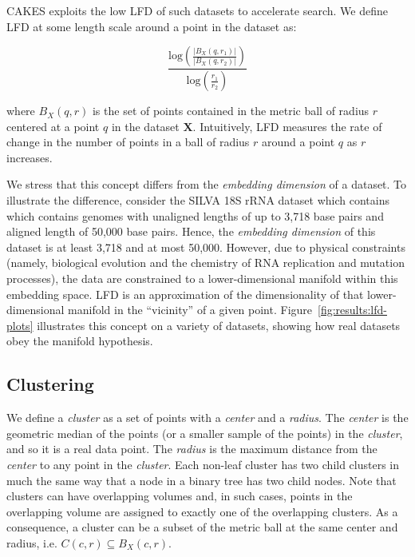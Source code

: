 CAKES exploits the low LFD of such datasets to accelerate search.
We define LFD at some length scale around a point in the dataset as:

\begin{equation}
    \frac{\text{log} \left( \frac{|B_X(q, r_1)|}{|B_X(q, r_2)|} \right) }{\text{log} \left( \frac{r_1}{r_2} \right) }
    \label{eq:methods:lfd-original}
\end{equation}

where $B_X(q, r)$ is the set of points contained in the metric ball of radius $r$ centered at a point $q$ in the dataset $\textbf{X}$.
Intuitively, LFD measures the rate of change in the number of points in a ball of radius $r$ around a point $q$ as $r$ increases.

We stress that this concept differs from the \textit{embedding dimension} of a dataset.
To illustrate the difference, consider the SILVA 18S rRNA dataset which contains which contains genomes with unaligned lengths of up to 3,718 base pairs and aligned length of 50,000 base pairs.
Hence, the \textit{embedding dimension} of this dataset is at least 3,718 and at most 50,000.
However, due to physical constraints (namely, biological evolution and the chemistry of RNA replication and mutation processes), the data are constrained to a lower-dimensional manifold within this embedding space.
LFD is an approximation of the dimensionality of that lower-dimensional manifold in the ``vicinity'' of a given point.
Figure~\ref{fig:results:lfd-plots} illustrates this concept on a variety of datasets, showing how real datasets obey the manifold hypothesis.


\subsection{Clustering}
\label{sec:methods:clustering}

We define a \textit{cluster} as a set of points with a \textit{center} and a \textit{radius}.
The \textit{center} is the geometric median of the points (or a smaller sample of the points) in the \textit{cluster}, and so it is a real data point.
The \textit{radius} is the maximum distance from the \textit{center} to any point in the \textit{cluster}.
Each non-leaf cluster has two child clusters in much the same way that a node in a binary tree has two child nodes.
Note that clusters can have overlapping volumes and, in such cases, points in the overlapping volume are assigned to exactly one of the overlapping clusters.
As a consequence, a cluster can be a subset of the metric ball at the same center and radius, i.e. $C(c, r) \subseteq B_X(c, r)$.

